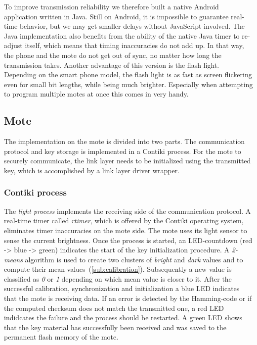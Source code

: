 \documentclass{sig-alternate} %
\begin{document}
To improve transmission reliability we therefore built a native Android application written in Java.
Still on Android, it is impossible to guarantee real-time behavior, but we may get smaller delays without JavaScript involved.
The Java implementation also benefits from the ability of the native Java timer to re-adjust itself, which means that timing inaccuracies do not add up.
In that way, the phone and the mote do not get out of sync, no matter how long the transmission takes.
Another advantage of this version is the flash light.
Depending on the smart phone model, the flash light is as fast as screen flickering even for small bit lengths, while being much brighter.
Especially when attempting to program multiple motes at once this comes in very handy.


\subsection{Mote}
\label{sub:mote}

The implementation on the mote is divided into two parts.
The communication protocol and key storage is implemented in a Contiki process.
For the mote to securely communicate, the link layer needs to be initialized using the transmitted key, which is accomplished by a link layer driver wrapper.

\subsubsection{Contiki process}
\label{ssub:contiki_process}

The \textit{light process} implements the receiving side of the communication protocol.
A real-time timer called \textit{rtimer}, which is offered by the Contiki operating system, eliminates timer inaccuracies on the mote side.
The mote uses its light sensor to sense the current brightness.
Once the process is started, an LED-countdown (red -> blue -> green) indicates the start of the key initialization procedure.
A \mbox{\textit{2-means}} algorithm is used to create two clusters of \textit{bright} and \textit{dark} values and to compute their mean values~(\ref{sub:calibration}).
Subsequently a new value is classified as \textit{0} or \textit{1} depending on which mean value is closer to it.
After the successful calibration, synchronization and initialization a blue LED indicates that the mote is receiving data.
If an error is detected by the Hamming-code or if the computed checksum does not match the transmitted one, a red LED indidcates the failure and the process should be restarted.
A green LED shows that the key material has successfully been received and was saved to the permanent flash memory of the mote.
\end{document}
